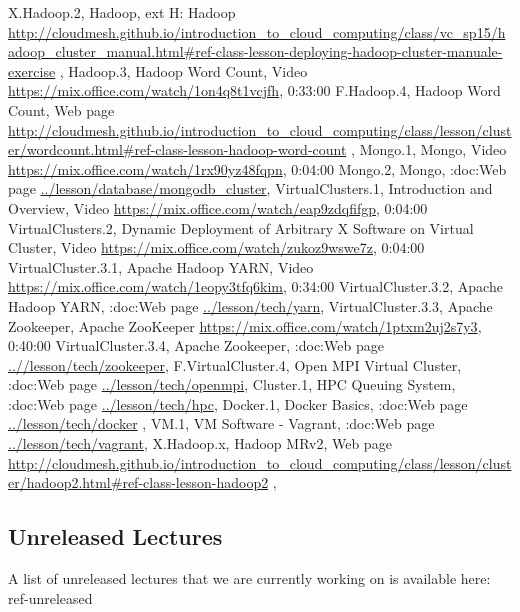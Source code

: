 \documentclass{article}
\begin{document}
X.Hadoop.2, Hadoop, ext H: Hadoop \url{http://cloudmesh.github.io/introduction_to_cloud_computing/class/vc_sp15/hadoop_cluster_manual.html#ref-class-lesson-deploying-hadoop-cluster-manuale-exercise}  , 
Hadoop.3, Hadoop Word Count, Video \url{https://mix.office.com/watch/1on4q8t1vcjfh},   0:33:00
F.Hadoop.4, Hadoop Word Count, Web page \url{http://cloudmesh.github.io/introduction_to_cloud_computing/class/lesson/cluster/wordcount.html#ref-class-lesson-hadoop-word-count}  , 
Mongo.1, Mongo, Video  \url{https://mix.office.com/watch/1rx90yz48fqpn},  0:04:00
Mongo.2, Mongo, :doc:Web page \url{../lesson/database/mongodb_cluster}, 
VirtualClusters.1, Introduction and Overview, Video \url{https://mix.office.com/watch/eap9zdqfifgp},   0:04:00   
VirtualClusters.2, Dynamic Deployment of Arbitrary X Software on Virtual Cluster,  Video \url{https://mix.office.com/watch/zukoz9wswe7z},   0:04:00
VirtualCluster.3.1, Apache Hadoop YARN, Video \url{https://mix.office.com/watch/1eopy3tfq6kim},   0:34:00
VirtualCluster.3.2, Apache Hadoop YARN, :doc:Web page \url{../lesson/tech/yarn},   
VirtualCluster.3.3, Apache Zookeeper, Apache ZooKeeper \url{https://mix.office.com/watch/1ptxm2uj2s7y3},   0:40:00
VirtualCluster.3.4, Apache Zookeeper, :doc:Web page \url{..//lesson/tech/zookeeper}, 
F.VirtualCluster.4, Open MPI Virtual Cluster,  :doc:Web page \url{../lesson/tech/openmpi},
Cluster.1, HPC Queuing System, :doc:Web page \url{../lesson/tech/hpc},
Docker.1, Docker Basics, :doc:Web page \url{../lesson/tech/docker} ,
VM.1, VM Software - Vagrant, :doc:Web page \url{../lesson/tech/vagrant}, 
X.Hadoop.x, Hadoop MRv2, Web page \url{http://cloudmesh.github.io/introduction_to_cloud_computing/class/lesson/cluster/hadoop2.html#ref-class-lesson-hadoop2} ,



\subsection{Unreleased Lectures}\label{unreleased-lectures}

A list of unreleased lectures that we are currently working on is
available here: ref-unreleased
\end{document}
